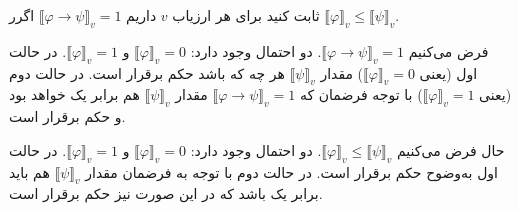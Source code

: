 ثابت کنید برای هر ارزیاب $v$ داریم
$\llbracket \varphi\to\psi\rrbracket_v=1$
اگرر
$\llbracket\varphi\rrbracket_v\leq\llbracket\psi\rrbracket_v$.
\begin{ans}
فرض می‌کنیم $\llbracket \varphi\to\psi\rrbracket_v=1$. دو احتمال وجود دارد:
$\llbracket\varphi\rrbracket_v=0$
و
$\llbracket\varphi\rrbracket_v=1$.
در حالت اول (یعنی
$\llbracket\varphi\rrbracket_v=0$)
مقدار $\llbracket\psi\rrbracket_v$ هر چه که باشد حکم برقرار است. در حالت دوم (یعنی
$\llbracket\varphi\rrbracket_v=1$)
با توجه فرضمان که
$\llbracket \varphi\to\psi\rrbracket_v=1$
مقدار
$\llbracket\psi\rrbracket_v$
هم برابر یک خواهد بود و حکم برقرار است.

حال فرض می‌کنیم $\llbracket\varphi\rrbracket_v\leq\llbracket\psi\rrbracket_v$. دو احتمال وجود دارد:
$\llbracket\varphi\rrbracket_v=0$
و
$\llbracket\varphi\rrbracket_v=1$.
در حالت اول به‌وضوح حکم برقرار است. در حالت دوم با توجه به فرضمان مقدار
$\llbracket\psi\rrbracket_v$
هم باید برابر یک باشد که در این صورت نیز حکم برقرار است.
\end{ans}
